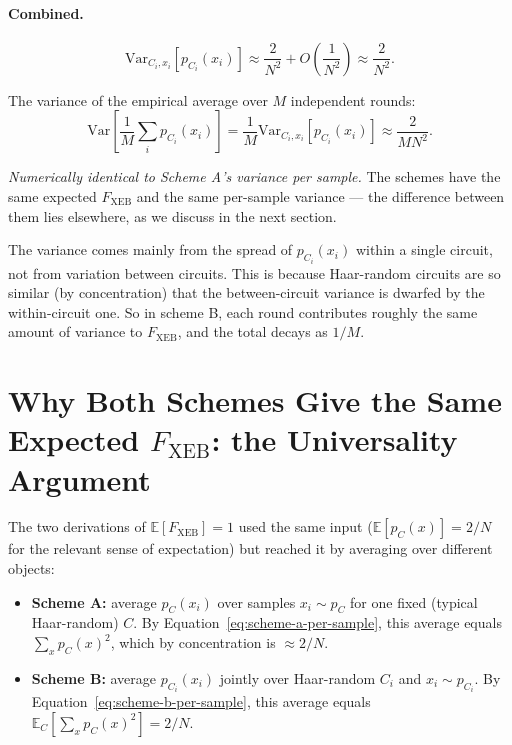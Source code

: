 \documentclass[11pt]{article}
\theoremstyle{plain}
\theoremstyle{definition}
\newcommand{\Fxeb}{F_{\text{XEB}}}
\newcommand{\E}{\mathbb{E}}
\newcommand{\Var}{\mathrm{Var}}
\begin{document}
\paragraph{Combined.} 
\begin{equation}
\Var_{C_i, x_i}[p_{C_i}(x_i)] \approx \frac{2}{N^2} + O\!\left(\frac{1}{N^2}\right) \approx \frac{2}{N^2}.
\label{eq:scheme-b-per-round-var}
\end{equation}

The variance of the empirical average over $M$ independent rounds:
\begin{equation}
\Var\!\left[\frac{1}{M}\sum_i p_{C_i}(x_i)\right] = \frac{1}{M} \Var_{C_i, x_i}[p_{C_i}(x_i)] \approx \frac{2}{MN^2}.
\label{eq:scheme-b-mean-var}
\end{equation}

\emph{Numerically identical to Scheme A's variance per sample.} The schemes have the same expected $\Fxeb$ and the same per-sample variance --- the difference between them lies elsewhere, as we discuss in the next section.

\begin{intuition}
The variance comes mainly from the spread of $p_{C_i}(x_i)$ within a single circuit, not from variation between circuits. This is because Haar-random circuits are so similar (by concentration) that the between-circuit variance is dwarfed by the within-circuit one. So in scheme B, each round contributes roughly the same amount of variance to $\Fxeb$, and the total decays as $1/M$.
\end{intuition}

\section{Why Both Schemes Give the Same Expected $\Fxeb$: the Universality Argument}
\label{sec:universality}

The two derivations of $\E[\Fxeb] = 1$ used the same input ($\E[p_C(x)] = 2/N$ for the relevant sense of expectation) but reached it by averaging over different objects:

\begin{itemize}[leftmargin=2em, itemsep=4pt]
\item \textbf{Scheme A:} average $p_C(x_i)$ over samples $x_i \sim p_C$ for one fixed (typical Haar-random) $C$. By Equation~\eqref{eq:scheme-a-per-sample}, this average equals $\sum_x p_C(x)^2$, which by concentration is $\approx 2/N$.
\item \textbf{Scheme B:} average $p_{C_i}(x_i)$ jointly over Haar-random $C_i$ and $x_i \sim p_{C_i}$. By Equation~\eqref{eq:scheme-b-per-sample}, this average equals $\E_C[\sum_x p_C(x)^2] = 2/N$.
\end{itemize}
\end{document}
